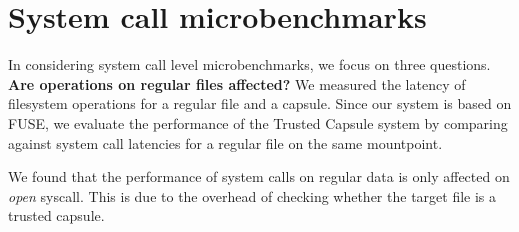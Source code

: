 


\section{System call microbenchmarks}



In considering system call level microbenchmarks, we focus on three
questions.\\

\textbf{Are operations on regular files affected?} 
We measured the latency of filesystem operations for a regular file and a capsule. Since our system is based on FUSE, we evaluate the performance of the Trusted Capsule system by comparing against system call latencies for a regular file on the same mountpoint.

We found that the performance of system calls on regular data is only affected on \textit{open} syscall. 
This is due to the overhead of checking whether the target file is a trusted capsule. \\

